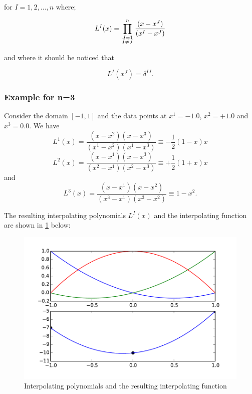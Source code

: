 for $I=1,2,...,n$ where;

\begin{equation}
{L^I}(x) = \prod\limits_{\scriptstyle J = 1\hfill\atop
\scriptstyle I \ne J\hfill}^n {\frac{{(x - {x^J})}}{{({x^I} - {x^J})}}}
\label{coef}
\end{equation}

and where it should be noticed that

\[{L^I}({x^J}) = {\delta ^{IJ}}.\]

\subsubsection*{Example for n=3}

Consider the domain $[ - 1,1]$ and the data points at ${x^1} =  - 1.0$, ${x^2} =  + 1.0$ and ${x^3} = 0.0$. We have
\[{L^1}(x) = \frac{{\left( {x - {x^2}} \right)\left( {x - {x^3}} \right)}}{{\left( {{x^1} - {x^2}} \right)\left( {{x^1} - {x^3}} \right)}} \equiv  - \frac{1}{2}\left( {1 - x} \right)x\]
\[{L^2}(x) = \frac{{\left( {x - {x^1}} \right)\left( {x - {x^3}} \right)}}{{\left( {{x^2} - {x^1}} \right)\left( {{x^2} - {x^3}} \right)}} \equiv  + \frac{1}{2}\left( {1 + x} \right)x\]
and
\[{L^3}(x) = \frac{{\left( {x - {x^1}} \right)\left( {x - {x^2}} \right)}}{{\left( {{x^3} - {x^1}} \right)\left( {{x^3} - {x^2}} \right)}} \equiv 1 - {x^2}.\]

The resulting interpolating polynomials ${L^I}(x)$ and the interpolating function  are shown in \cref{fig:pols} below:

\begin{figure}[H]
\centering
\includegraphics[width=16cm]{img/func.pdf}
\caption{Interpolating polynomials and the resulting interpolating function}
\label{fig:pols}
\end{figure}

